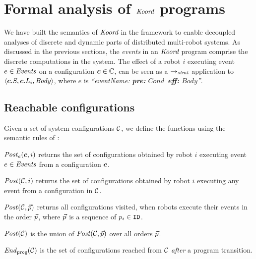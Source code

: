 
\section{Formal analysis of $\emph{Koord}$ programs}
\label{sec:verification}

\newcommand{\Ev}{\ensuremath{e}\xspace}
\newcommand{\EvCond}{\ensuremath{\mathit{Cond}}\xspace}
\newcommand{\EvBody}{\ensuremath{\mathit{Body}}\xspace}


We have built the semantics of $\emph{Koord}$ in the \K framework to enable decoupled analyses of discrete and dynamic parts of distributed multi-robot systems.
As discussed in the previous sections, the \emph{events} in an $\emph{Koord}$ program comprise the discrete computations in the system.
The effect of a robot $i$ executing event $\Ev \in \Event$ on a configuration $\mathit{\boldsymbol{c}} \in \mathbb{C}$,
can be seen as a $\rightarrow_\mathit{stmt}$ application to  $\left\langle \gconfig.S, \gconfig.\lconfig{i}, \EvBody \right\rangle $,
where $\Ev$ is \emph{``eventName: {\normalfont\bf pre:} \EvCond\ {\normalfont\bf eff:} \EvBody''}.


\subsection{Reachable configurations}

Given a set of system configurations $\mathcal{C}$, we define the functions using the semantic rules of :
\begin{inparaenum}[(i)]
    \item $\Post_\Ev(\gconfig,i)$ returns the set of configurations obtained by robot $i$ executing event $\Ev \in \Event$ from a configuration $\mathit{\boldsymbol{c}}$.
    \item $\mathit{Post}(\mathcal{C},i)$ returns the set of configurations obtained by robot $i$ executing any event from a configuration in $\mathcal{C}$.
    \item $\mathit{Post}(\mathcal{C},\vec{p})$ returns all configurations visited, when robots execute their events in the order $\vec{p}$,
          where $\vec{p}$ is a sequence of $p_i \in \texttt{ID}$.
    \item $\mathit{Post}(\mathcal{C})$ is the union of $\mathit{Post}(\mathcal{C},\vec{p})$ over all orders $\vec{p}$.
    \item $\mathit{End}_{\mathtt{prog}}(\mathcal{C})$ is the set of configurations reached from $\mathcal{C}$ \emph{after} a program transition.
\end{inparaenum}

